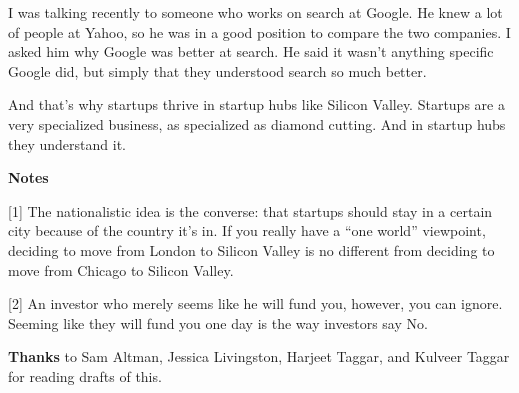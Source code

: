 I was talking recently to someone who works on search at Google. He knew
a lot of people at Yahoo, so he was in a good position to compare the
two companies. I asked him why Google was better at search. He said it
wasn't anything specific Google did, but simply that they understood
search so much better.

And that's why startups thrive in startup hubs like Silicon Valley.
Startups are a very specialized business, as specialized as diamond
cutting. And in startup hubs they understand it.

\textbf{Notes}

{[}1{]} The nationalistic idea is the converse: that startups should
stay in a certain city because of the country it's in. If you really
have a ``one world'' viewpoint, deciding to move from London to Silicon
Valley is no different from deciding to move from Chicago to Silicon
Valley.

{[}2{]} An investor who merely seems like he will fund you, however, you
can ignore. Seeming like they will fund you one day is the way investors
say No.~

\textbf{Thanks} to Sam Altman, Jessica Livingston, Harjeet Taggar, and
Kulveer Taggar for reading drafts of this.
